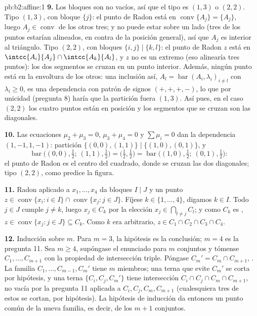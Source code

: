 \begin{solution}{pb:b2:affine:1}
\textbf{9.} Los bloques son no vacíos, así que el tipo es $(1,3)$ o
$(2,2)$. Tipo $(1,3)$, con bloque $\{j\}$: el punto de Radon está en
$\operatorname{conv}\{A_j\} = \{A_j\}$, luego $A_j \in
\operatorname{conv}$ de los otros tres; y no puede estar sobre un
lado (tres de los puntos estarían alineados, en contra de la posición
general), así que $A_j$ es interior al triángulo. Tipo $(2,2)$, con
bloques $\{i,j\} \mid \{k,l\}$: el punto de Radon $z$ está en
$\intcc{A_i}{A_j} \cap \intcc{A_k}{A_l}$, y $z$ no es un extremo (eso
alinearía tres puntos): los dos segmentos se cruzan en un punto
interior. Además, ningún punto está en la envoltura de los otros: una
inclusión así, $A_l = \operatorname{bar}(A_i, \lambda_i)_{i \neq l}$
con $\lambda_i \geq 0$, es una dependencia  con patrón de signos
$(+,+,+,-)$, lo que por unicidad (pregunta 8) haría que la partición
fuera $(1,3)$. Así pues, en el caso $(2,2)$ los cuatro puntos están
en posición  y los segmentos que se cruzan son las
diagonales.

\textbf{10.} Las ecuaciones $\mu_2 + \mu_3 = 0$, $\mu_3 + \mu_4 = 0$
y $\sum\mu_i = 0$ dan la dependencia $(1, -1, 1, -1)$: partición
$\{(0,0), (1,1)\} \mid \{(1,0), (0,1)\}$, y
\[
\operatorname{bar}\bigl((0,0), \tfrac12;\ (1,1),
\tfrac12\bigr) = \bigl(\tfrac12, \tfrac12\bigr) =
\operatorname{bar}\bigl((1,0), \tfrac12;\ (0,1),
\tfrac12\bigr) :
\]
el punto de Radon es el centro del cuadrado, donde se cruzan las dos
diagonales; tipo $(2,2)$, como predice la figura.

\textbf{11.} Radon aplicado a $x_1, \dots, x_4$ da bloques $I \mid J$
y un punto $z \in \operatorname{conv}\{x_i : i \in I\} \cap
\operatorname{conv}\{x_j : j \in J\}$. Fíjese $k \in \{1, \dots,
4\}$, digamos $k \in I$. Todo $j \in J$ cumple $j \neq k$, luego $x_j
\in C_k$ por la elección $x_j \in \bigcap_{l \neq j}C_l$; y como
$C_k$ es , $z \in \operatorname{conv}\{x_j : j \in J\}
\subseteq C_k$. Como $k$ era arbitrario, $z \in C_1 \cap C_2 \cap C_3
\cap C_4$.

\textbf{12.} Inducción sobre $m$. Para $m = 3$, la hipótesis es la
conclusión; $m = 4$ es la pregunta 11. Sea $m \geq 4$, supóngase el
enunciado para $m$ conjuntos y tómense $C_1, \dots, C_{m+1}$ con la
propiedad de intersección triple. Póngase $C_m' = C_m \cap C_{m+1}$,
. La familia $C_1, \dots, C_{m-1}, C_m'$ tiene $m$ miembros;
una terna que evite $C_m'$ se corta por hipótesis, y una terna
$\{C_i, C_j, C_m'\}$ tiene intersección $C_i \cap C_j \cap C_m \cap
C_{m+1}$, no vacía por la pregunta 11 aplicada a $C_i, C_j, C_m,
C_{m+1}$ (cualesquiera tres de estos se cortan, por hipótesis). La
hipótesis de inducción da entonces un punto común de la nueva
familia, es decir, de los $m+1$ conjuntos.


\end{solution}
